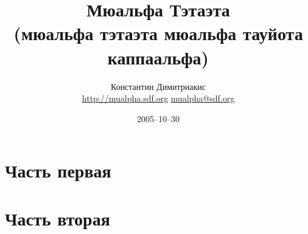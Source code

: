 \documentclass[a4paper,oneside]{report}
\begin{document}
\title{Мюальфа Тэтаэта\\{\normalsize(мюальфа тэтаэта мюальфа тауйота каппаальфа)}}
\author{Константин Димитриакис\\
\href{http://mualpha.sdf.org}{http://mualpha.sdf.org}\qquad
\href{mailto:mualpha@sdf.org}{mualpha@sdf.org}}
\date{2005--10--30}

\maketitle
\tableofcontents

\chapter*{Часть первая}
\setcounter{chapter}{1}
\setcounter{section}{0}








\chapter*{Часть вторая}
\setcounter{chapter}{2}
\setcounter{section}{0}











\end{document}
